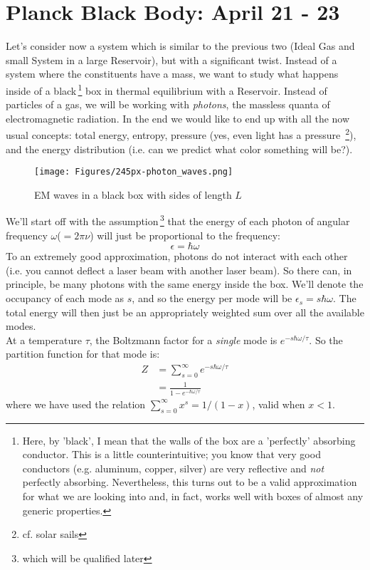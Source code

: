 \section{Planck Black Body: April 21 - 23}

Let's consider now a system which is similar to the previous two (Ideal Gas and small System in a large Reservoir), but with a significant twist. Instead of a system where the constituents have a mass, we want to study what happens inside of a 
black\,\footnote{Here, by 'black', I mean that the walls of the box are a 'perfectly' absorbing conductor. This is a little counterintuitive; you know that very good conductors (e.g. aluminum, copper, silver) are very reflective and \emph{not} perfectly absorbing. Nevertheless, this turns out to be a valid approximation for what we are looking into and, in fact, works well with boxes of almost any generic properties.} box in thermal equilibrium with a Reservoir. Instead of particles of a gas, we will be working with \textit{photons}, the massless quanta of electromagnetic radiation. In the end we would like to end up with all the now usual concepts: total energy, entropy, pressure (yes, even light has a 
pressure~\footnote{cf. solar sails}), and the energy distribution (i.e. can 
we predict what color something will be?). \\

\begin{figure}[h]
\centering
\texttt{[image: Figures/245px-photon\_waves.png]}
\caption{EM waves in a black box with sides of length $L$}
\end{figure}


We'll start off with the assumption\,\footnote{which will be qualified later} that the energy of each photon of angular frequency $\omega$($=2 \pi \nu$) will just be proportional to the frequency:
\begin{equation}
\epsilon = \hbar \omega
\end{equation}
To an extremely good approximation, photons do not interact with each other (i.e. you cannot deflect a laser beam with another laser beam). So there can, in principle, be many photons with the same energy inside the box. We'll denote the occupancy of each mode as $s$, and so the energy per mode will be $\epsilon_s = s \hbar \omega$. The total energy will then just be an appropriately weighted sum over all the available modes.\\

At a temperature $\tau$, the Boltzmann factor for a \textit{single} mode 
is $e^{-s \hbar \omega / \tau}$. So the partition function for that mode is:
\begin{align}
Z &= \sum_{s=0}^{\infty} e^{-s \hbar \omega / \tau} \\
  &= \frac{1}{1 - e^{-\hbar \omega / \tau}}
\label{eq:PartPlanck}
\end{align}
where we have used the relation $\sum_{s=0}^{\infty} x^s = 1/(1-x)$, 
valid when $x < 1$. \\

